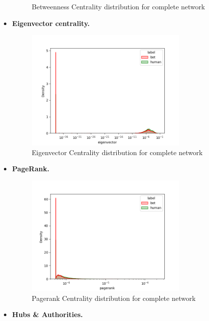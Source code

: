 \documentclass[12pt, a4paper]{article}
\begin{document}
\begin{itemize}
\begin{figure}[H]
                    \caption{Betweenness Centrality distribution for complete network}
                \end{figure}
			\item \textbf{Eigenvector centrality.}
				\begin{figure}[H]
                    \centering
                    \includegraphics[width=0.75\textwidth]{results/complete_eigenvector.png}
                    \caption{Eigenvector Centrality distribution for complete network}
                \end{figure}      
			\item \textbf{PageRank.}
                \begin{figure}[H]
                    \centering
                    \includegraphics[width=0.75\textwidth]{results/complete_pagerank.png}
                    \caption{Pagerank Centrality distribution for complete network}
                \end{figure}
            \item \textbf{Hubs \& Authorities.}
                \begin{figure}[H]

\end{figure}
\end{itemize}
\end{document}
